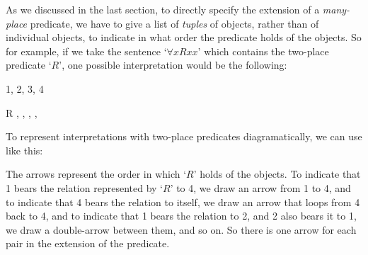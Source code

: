 As we discussed in the last section, to directly specify the extension of a \emph{many-place} predicate, we have to give a list of \emph{tuples} of objects, rather than of individual objects, to indicate in what order the predicate holds of the objects.  So for example, if we take the sentence `$\forall xRxx$' which contains the two-place predicate `$R$', one possible interpretation would be the following:
	\begin{ekey}
		\item[\text{Domain}] 1, 2, 3, 4
		\item[R], ,  ,  ,
	\end{ekey}
To represent interpretations with two-place predicates diagramatically, we can use  like this:
\begin{center}
\end{center}
The arrows represent the order in which `$R$' holds of the objects.  To indicate that 1 bears the relation represented by `$R$' to 4, we draw an arrow from 1 to 4, and to indicate that 4 bears the relation to itself, we draw an arrow that loops from 4 back to 4, and to indicate that 1 bears the relation to 2, and 2 also bears it to 1, we draw a double-arrow between them, and so on.  So there is one arrow for each pair in the extension of the predicate.



